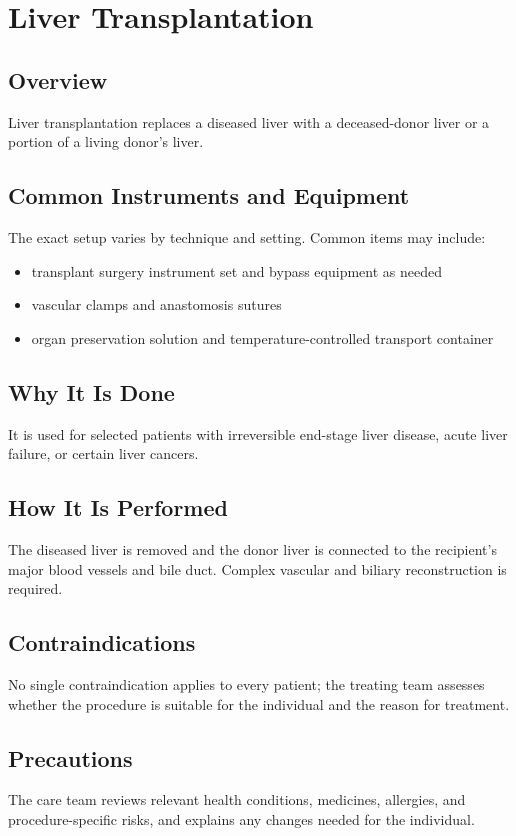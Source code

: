\chapter{Liver Transplantation}
\section*{Overview}
Liver transplantation replaces a diseased liver with a deceased-donor liver or a portion of a living donor's liver.
\section*{Common Instruments and Equipment}
The exact setup varies by technique and setting. Common items may include:
\begin{itemize}[nosep,leftmargin=*]
  \item transplant surgery instrument set and bypass equipment as needed
  \item vascular clamps and anastomosis sutures
  \item organ preservation solution and temperature-controlled transport container
\end{itemize}

\section*{Why It Is Done}
It is used for selected patients with irreversible end-stage liver disease, acute liver failure, or certain liver cancers.
\section*{How It Is Performed}
The diseased liver is removed and the donor liver is connected to the recipient's major blood vessels and bile duct. Complex vascular and biliary reconstruction is required.
\section*{Contraindications}
No single contraindication applies to every patient; the treating team assesses whether the procedure is suitable for the individual and the reason for treatment.

\section*{Precautions}
The care team reviews relevant health conditions, medicines, allergies, and procedure-specific risks, and explains any changes needed for the individual.

